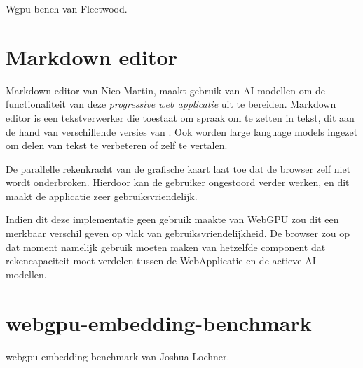 Wgpu-bench van Fleetwood. \autocite{Fleetwood2023d}

\section{Markdown editor}

Markdown editor van Nico Martin, maakt gebruik van AI-modellen om de functionaliteit van deze \textit{progressive web applicatie} uit te bereiden. Markdown editor is een tekstverwerker die toestaat om spraak om te zetten in tekst, dit aan de hand van verschillende versies van \textcite{radford2022whisper}. Ook worden {large language models} ingezet om delen van tekst te verbeteren of zelf te vertalen. 

\bigbreak{}

De parallelle rekenkracht van de grafische kaart laat toe dat de browser zelf niet wordt onderbroken. Hierdoor kan de gebruiker ongestoord verder werken, en dit maakt de applicatie zeer gebruiksvriendelijk.

\bigbreak{}

Indien dit deze implementatie geen gebruik maakte van WebGPU zou dit een merkbaar verschil geven op vlak van gebruiksvriendelijkheid. De browser zou op dat moment namelijk gebruik moeten maken van hetzelfde component dat rekencapaciteit moet verdelen tussen de WebApplicatie en de actieve AI-modellen. \autocite{Martin2020}

\section{webgpu-embedding-benchmark}

webgpu-embedding-benchmark van Joshua Lochner. \autocite{Lochner2024}